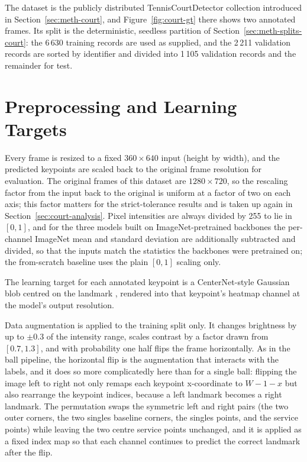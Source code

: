 The dataset is the publicly distributed TennisCourtDetector collection introduced
in Section~\ref{sec:meth-court}, and Figure~\ref{fig:court-gt} there shows two
annotated frames. Its split is the deterministic, seedless partition of
Section~\ref{sec:meth-splits-court}: the 6\,630 training records are used as
supplied, and the 2\,211 validation records are sorted by identifier and divided
into 1\,105 validation records and the remainder for test. 

\section{Preprocessing and Learning Targets}
\label{sec:court-preproc}

Every frame is resized to a fixed $360 \times 640$ input (height by width), and the predicted keypoints are
scaled back to the original frame resolution for evaluation. The original frames
of this dataset are $1280 \times 720$, so the rescaling factor from the input
back to the original is uniform at a factor of two on each axis; this factor
matters for the strict-tolerance results and is taken up again in
Section~\ref{sec:court-analysis}. Pixel intensities are always divided by 255 to
lie in $[0, 1]$, and for the three models built on ImageNet-pretrained backbones
the per-channel ImageNet mean and standard deviation are additionally subtracted
and divided, so that the inputs match the statistics the backbones were
pretrained on; the from-scratch baseline uses the plain $[0, 1]$ scaling only.

The learning target for each annotated keypoint is a CenterNet-style Gaussian
blob centred on the landmark \cite{zhou2019centernet}, rendered into that
keypoint's heatmap channel at the model's output resolution.

Data augmentation is applied to the training split only. It changes brightness
by up to $\pm 0.3$ of the intensity range, scales contrast by a factor drawn from
$[0.7, 1.3]$, and with probability one half flips the frame horizontally. As in
the ball pipeline, the horizontal flip is the augmentation that interacts with the
labels, and it does so more complicatedly here than for a single ball: flipping the
image left to right not only remaps each keypoint x-coordinate to $W - 1 - x$ but
also rearrange the keypoint indices, because a left landmark becomes a right
landmark. The permutation swaps the symmetric left and right pairs (the two outer
corners, the two singles baseline corners, the singles points, and the service
points) while leaving the two centre service points unchanged, and it is applied
as a fixed index map so that each channel continues to predict the correct
landmark after the flip.


